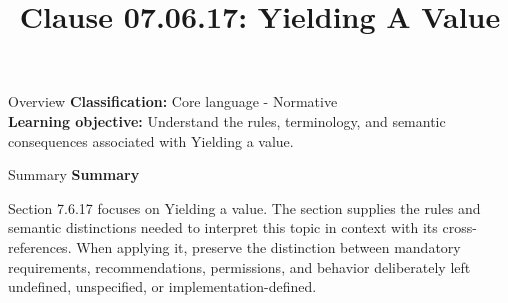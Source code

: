 \documentclass[10pt,letterpaper]{article}
\title{Clause 07.06.17: Yielding A Value}
\author{}
\date{}
\begin{document}
\maketitle
\begin{CornellOverviewBox}{Overview}
\textbf{Classification:} Core language - Normative\\[2pt]
\textbf{Learning objective:} Understand the rules, terminology, and semantic consequences associated with Yielding a value.
\end{CornellOverviewBox}\begin{CornellSummaryBox}{Summary}
{\sffamily\bfseries\color{Accent} Summary}\par\vspace{3pt}Section 7.6.17 focuses on Yielding a value. The section supplies the rules and semantic distinctions needed to interpret this topic in context with its cross-references. When applying it, preserve the distinction between mandatory requirements, recommendations, permissions, and behavior deliberately left undefined, unspecified, or implementation-defined.
\end{CornellSummaryBox}
\end{document}
